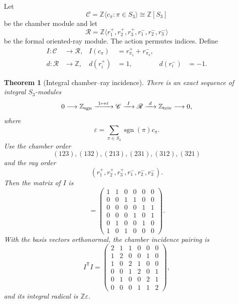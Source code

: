 \documentclass[11pt]{article}
\newtheorem{theorem}{Theorem}[section]
\theoremstyle{definition}
\theoremstyle{remark}
\numberwithin{equation}{section}
\begin{document}
Let
\[
 \mathscr C=\mathbb Z\langle c_\pi:\pi\in S_3\rangle
 \cong\mathbb Z[S_3]
\]
be the chamber module and let
\[
 \mathscr R=\mathbb Z\langle r_1^+,r_2^+,r_3^+,
                                  r_1^-,r_2^-,r_3^-\rangle
\]
be the formal oriented-ray module.  The action permutes indices.  Define
\begin{align}
 I:\mathscr C&\longrightarrow\mathscr R,&
 I(c_\pi)&=r_{\pi_1}^++r_{\pi_3}^-,                   \label{eq:rank6-incidence-map}\\
 d:\mathscr R&\longrightarrow\mathbb Z,&
 d(r_i^+)&=1,& d(r_i^-)&=-1.                           \label{eq:rank6-ray-augmentation}
\end{align}

\begin{theorem}[Integral chamber--ray incidence]
\label{thm:rank6-incidence}
There is an exact sequence of integral \(S_3\)-modules
\begin{equation}
 0\longrightarrow\mathbb Z_{\rm sgn}
 \xrightarrow{\ 1\mapsto\varepsilon\ }\mathscr C
 \xrightarrow{\ I\ }\mathscr R
 \xrightarrow{\ d\ }\mathbb Z_{\rm triv}
 \longrightarrow0,                                    \label{eq:rank6-incidence-exact}
\end{equation}
where
\begin{equation}
 \varepsilon=\sum_{\pi\in S_3}\operatorname{sgn}(\pi)c_\pi.
                                                        \label{eq:rank6-epsilon}
\end{equation}
Use the chamber order
\[
 (123),(132),(213),(231),(312),(321)
\]
and the ray order
\[
 (r_1^+,r_2^+,r_3^+,r_1^-,r_2^-,r_3^-).
\]
Then the matrix of \(I\) is
\begin{equation}
 [I]=
 \begin{pmatrix}
 1&1&0&0&0&0\\
 0&0&1&1&0&0\\
 0&0&0&0&1&1\\
 0&0&0&1&0&1\\
 0&1&0&0&1&0\\
 1&0&1&0&0&0
 \end{pmatrix}.                                        \label{eq:rank6-incidence-matrix}
\end{equation}
With the basis vectors orthonormal, the chamber incidence pairing is
\begin{equation}
 I^{\mathsf T}I=
 \begin{pmatrix}
 2&1&1&0&0&0\\
 1&2&0&0&1&0\\
 1&0&2&1&0&0\\
 0&0&1&2&0&1\\
 0&1&0&0&2&1\\
 0&0&0&1&1&2
 \end{pmatrix},                                        \label{eq:rank6-incidence-pairing}
\end{equation}
and its integral radical is \(\mathbb Z\varepsilon\).
\end{theorem}
\end{document}
